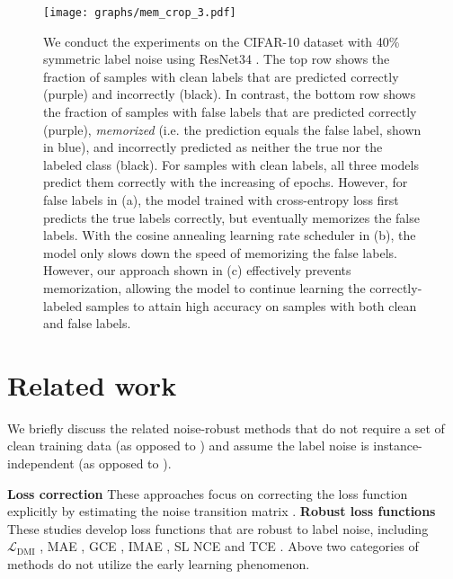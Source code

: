 \documentclass{article}
\begin{document}
\begin{figure}[t]
	\begin{center}
		\texttt{[image: graphs/mem\_crop\_3.pdf]}
	\end{center}
	\caption{We conduct the experiments on the CIFAR-10 dataset with 40\% symmetric label noise using ResNet34 \cite{he2016deep}. The top row shows the fraction of samples with clean labels that are predicted correctly (purple) and incorrectly (black). In contrast, the bottom row shows the fraction of samples with false labels that are predicted correctly (purple), \emph{memorized} (i.e. the prediction equals the false label, shown in blue), and incorrectly predicted as neither the true nor the labeled class (black). For samples with clean labels, all three models predict them correctly with the increasing of epochs. However, for false labels in (a), the model trained with cross-entropy loss first predicts the true labels correctly, but eventually memorizes the false labels. With the cosine annealing learning rate scheduler \cite{loshchilov2016sgdr} in (b), the model only slows down the speed of memorizing the false labels. However, our approach shown in (c) effectively prevents memorization, allowing the model to continue learning the correctly-labeled samples to attain high accuracy on samples with both clean and false labels.}
\label{fig:memorization}
	\vspace{-0.5em}
\end{figure}


\section{Related work}
We briefly discuss the related noise-robust methods that do not require a set of clean training data (as opposed to \cite{xiao2015learning,vahdat2017toward,veit2017learning,li2017learning,hendrycks2018using,ren2018learning,lee2018cleannet}) and assume the label noise is instance-independent (as opposed to \cite{cheng2020learning,xia2020parts}). 

\textbf{Loss correction} These approaches focus on correcting the loss function explicitly by estimating the noise transition matrix \cite{goldberger2016training,patrini2017making,tanno2019learning,xia2019anchor}. \textbf{Robust loss functions} These studies develop loss functions that are robust to label noise, including $\mathcal{L}_\text{DMI}$ \cite{xu2019l_dmi}, MAE \cite{ghosh2017robust}, GCE \cite{zhang2018generalized}, IMAE \cite{wang2019imae}, SL \cite{wang2019symmetric} NCE \cite{ma2020normalized} and TCE \cite{feng2020can}. Above two categories of methods do not utilize the early learning phenomenon.  
\end{document}
